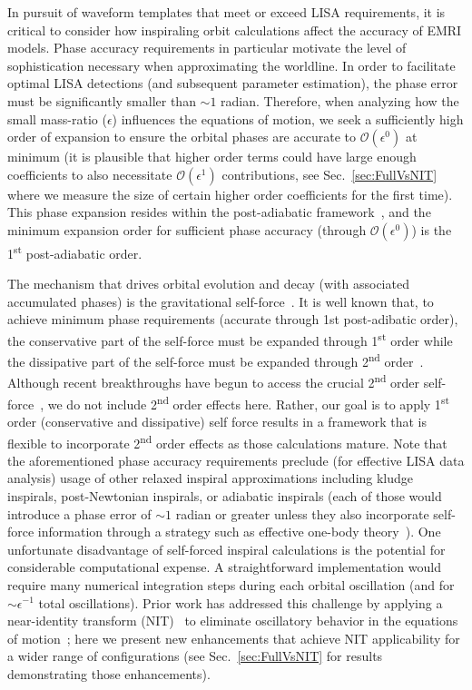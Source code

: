 \documentclass[aps,prd,twocolumn,showpacs,notitlepage,eqsecnum,
superscriptaddress,nofootinbib]{revtex4-1}
\begin{document}
In pursuit of waveform templates that meet or exceed LISA requirements, it is critical to consider how inspiraling orbit calculations affect the accuracy of EMRI models. Phase accuracy requirements in particular motivate the level of sophistication necessary when approximating the worldline. In order to facilitate optimal LISA detections (and subsequent parameter estimation), the phase error must be significantly smaller than $\sim 1$ radian. Therefore, when analyzing how the small mass-ratio ($\epsilon$) influences the equations of motion, we seek a sufficiently high order of expansion to ensure the orbital phases are accurate to $\mathcal{O}(\epsilon^0)$ at minimum (it is plausible that higher order terms could have large enough coefficients to also necessitate $\mathcal{O}(\epsilon^{1})$ contributions, see Sec.~\ref{sec:FullVsNIT} where we measure the size of certain higher order coefficients for the first time). This phase expansion resides within the post-adiabatic framework~\cite{HindFlan08}, and the minimum expansion order for sufficient phase accuracy (through $\mathcal{O}(\epsilon^0)$) is the 1\textsuperscript{st} post-adiabatic order.

The mechanism that drives orbital evolution and decay (with associated accumulated phases) is the gravitational self-force~\cite{Mino_1997,Quinn_1997}. It is well known that, to achieve minimum phase requirements (accurate through 1st post-adibatic order), the conservative part of the self-force must be expanded through 1\textsuperscript{st} order while the dissipative part of the self-force must be expanded through 2\textsuperscript{nd} order~\cite{HindFlan08}. Although recent breakthroughs have begun to access the crucial 2\textsuperscript{nd} order self-force~\cite{PounETC20,warburton2021gravitationalwave}, we do not include 2\textsuperscript{nd} order effects here. Rather, our goal is to apply 1\textsuperscript{st} order (conservative and dissipative) self force results in a framework that is flexible to incorporate 2\textsuperscript{nd} order effects as those calculations mature. Note that the aforementioned phase accuracy requirements preclude (for effective LISA data analysis) usage of other relaxed inspiral approximations including kludge inspirals, post-Newtonian inspirals, or adiabatic inspirals (each of those would introduce a phase error of $\sim 1$ radian or greater unless they also incorporate self-force information through a strategy such as effective one-body theory~\cite{Buonanno_1999,Antonelli_2020}). One unfortunate disadvantage of self-forced inspiral calculations is the potential for considerable computational expense. A straightforward implementation would require many numerical integration steps during each orbital oscillation (and for $\sim \epsilon^{-1}$ total oscillations). Prior work has addressed this challenge by applying a near-identity transform (NIT)~\cite{KevoCole96} to eliminate oscillatory behavior in the equations of motion~\cite{VandWarb18}; here we present new enhancements that achieve NIT applicability for a wider range of configurations (see Sec.~\ref{sec:FullVsNIT} for results demonstrating those enhancements).
\end{document}
